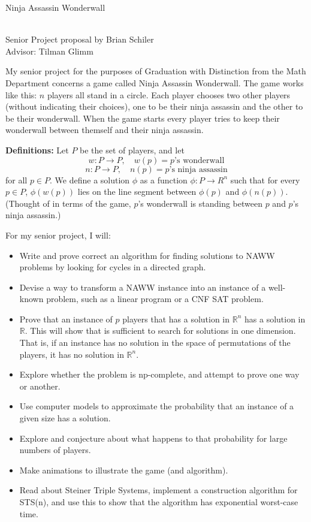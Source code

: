 \documentclass{article}
\begin{document}
\begin{center}
\begin{Large}
Ninja Assassin Wonderwall
\end{Large}\\
Senior Project proposal by Brian Schiler\\
Advisor: Tilman Glimm\\
\date{}
\vspace{20pt}
\end{center}
My senior project for the purposes of Graduation with Distinction from the Math Department concerns a game called Ninja Assassin Wonderwall. The game works like this: $n$ players all stand in a circle. Each player chooses two other players  (without indicating their choices), one to be their ninja assassin and the other to be their wonderwall. When the game starts every player tries to keep their wonderwall between themself and their ninja assassin. 

\textbf{Definitions:} Let $P$ be the set of players, and let \[w: P \to P,\quad w(p) = \text{$p$'s wonderwall}\] \[n: P \to P,\quad n(p) = \text{$p$'s ninja assassin}\] for all $p \in P$. We define a solution $\phi$ as a function $\phi: P \to R^n$ such that for every $p \in P$, $\phi(w(p))$ lies on the line segment between $\phi(p)$ and $\phi(n(p))$. (Thought of in terms of the game, $p$'s wonderwall is standing between $p$ and $p$'s ninja assassin.) 

For my senior project, I will:

\begin{itemize}
    \item Write and prove correct an algorithm for finding solutions to NAWW problems by looking for cycles in a directed graph.
    \item Devise a way to transform a NAWW instance into an instance of a well-known problem, such as a linear program or a CNF SAT problem.
    \item Prove that an instance of $p$ players that has a solution in $\mathbb{R}^n$ has a solution in $\mathbb{R}$. This will show that is sufficient to search for solutions in one dimension. That is, if an instance has no solution in the space of permutations of the players, it has no solution in $\mathbb{R}^n$.
    \item Explore whether the problem is np-complete, and attempt to prove one way or another.
    \item Use computer models to approximate the probability that an instance of a given size has a solution.
    \item Explore and conjecture about what happens to that probability for large numbers of players.
    \item Make animations to illustrate the game (and algorithm).
    \item Read about Steiner Triple Systems, implement a construction algorithm for STS(n), and use this to show that the algorithm has exponential worst-case time.
\end{itemize}
\end{document}
